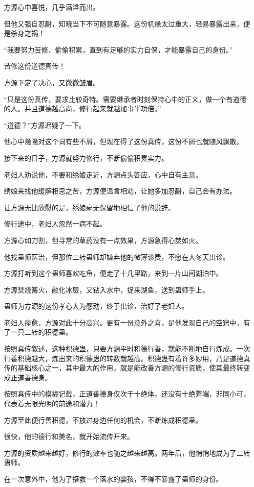 \begin{this_body}
方源心中喜悦，几乎满溢而出。

但他又强自忍耐，知晓当下不可随意暴露。这份机缘太过重大，轻易暴露出来，便是杀身之祸！

“我要努力苦修，偷偷积累，直到有足够的实力自保，才能暴露自己的身份。”

苦修这份道德真传！

方源下定了决心，又微微皱眉。

“只是这份真传，要求比较奇特。需要继承者时刻保持心中的正义，做一个有道德的人。并且道德越高尚，修行起来就越加事半功倍。”

“道德？”方源迟疑了一下。

他心中隐隐对这个词有些不屑，但现在得了这份真传，这份不屑也就随风飘散。

接下来的日子，方源就努力修行，不断偷偷积累实力。

老妇人劝说他，不要和绣娘走近，方源点头答应，心中自有主意。

绣娘来找他缓解相思之苦，方源便温言相劝，让她多加忍耐，自己会有办法。

让方源无比欣慰的是，绣娘毫无保留地相信了他的说辞。

修行途中，老妇人忽然一病不起。

方源心如刀割，但寻常的草药没有一点效果，方源急得心焚如火。

他找蛊师医治，但那位二转蛊师却嫌弃他的微薄诊费，不愿在大冬天出诊。

方源打听到这个蛊师喜欢吃鱼，便走了十几里路，来到一片山间湖泊中。

方源焚烧篝火，融化冰层，又钻入水中，捉来湖鱼，送到蛊师手上。

蛊师为方源的这份孝心大为感动，终于出诊，治好了老妇人。

老妇人痊愈，方源对此十分高兴。更有一份意外之喜，是他发现自己的空窍中，有了一只二转的积德蛊。

按照真传叙述，这种积德蛊，只要方源平时积德行善，就能不断地自行炼成。一次行善积德越大，炼出来的积德蛊的转数就越高。积德蛊有着许多妙用，乃是道德真传的基础核心之一，其中最大的作用，就是能改善方源的修行资质，使其最终转变成正道善德身。

按照真传中的模糊记载，正道善德身仅次于十绝体，还没有十绝弊端，非同小可，代表着无限光明的前途和潜力！

方源至此便行善积德，不放过身边任何的机会，不断炼成积德蛊。

很快，他的德行和美名，就开始流传开来。

方源的资质越来越好，修行的效率也随之越来越高。两年后，他悄悄地成为了二转蛊师。

在一次意外中，他为了搭救一个落水的婴孩，不得不暴露了蛊师的身份。


\end{this_body}

